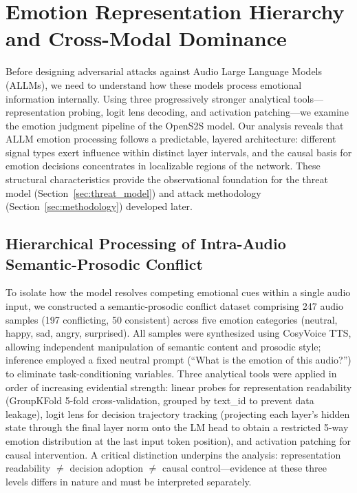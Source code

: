 
\section{Emotion Representation Hierarchy and Cross-Modal Dominance}
\label{sec:observation}

Before designing adversarial attacks against Audio Large Language Models (ALLMs), we need to understand how these models process emotional information internally. Using three progressively stronger analytical tools---representation probing, logit lens decoding, and activation patching---we examine the emotion judgment pipeline of the OpenS2S model. Our analysis reveals that ALLM emotion processing follows a predictable, layered architecture: different signal types exert influence within distinct layer intervals, and the causal basis for emotion decisions concentrates in localizable regions of the network. These structural characteristics provide the observational foundation for the threat model (Section~\ref{sec:threat_model}) and attack methodology (Section~\ref{sec:methodology}) developed later.

\subsection{Hierarchical Processing of Intra-Audio Semantic-Prosodic Conflict}
\label{sec:obs_intra}

To isolate how the model resolves competing emotional cues within a single audio input, we constructed a semantic-prosodic conflict dataset comprising 247 audio samples (197 conflicting, 50 consistent) across five emotion categories (neutral, happy, sad, angry, surprised). All samples were synthesized using CosyVoice TTS, allowing independent manipulation of semantic content and prosodic style; inference employed a fixed neutral prompt (``What is the emotion of this audio?'') to eliminate task-conditioning variables. Three analytical tools were applied in order of increasing evidential strength: linear probes for representation readability (GroupKFold 5-fold cross-validation, grouped by text\_id to prevent data leakage), logit lens for decision trajectory tracking (projecting each layer's hidden state through the final layer norm onto the LM head to obtain a restricted 5-way emotion distribution at the last input token position), and activation patching for causal intervention. A critical distinction underpins the analysis: representation readability $\neq$ decision adoption $\neq$ causal control---evidence at these three levels differs in nature and must be interpreted separately.

